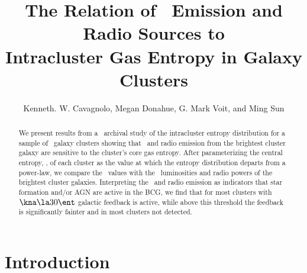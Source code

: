 \documentclass{emulateapj}
\begin{document}
\title{The Relation of \halpha\ Emission and Radio Sources to \\
  Intracluster Gas Entropy in Galaxy Clusters}
\author{
  Kenneth. W. Cavagnolo,
  Megan Donahue,
  G. Mark Voit,
  and Ming Sun}


\begin{abstract}
  We present results from a \Chandra\ archival study of the
  intracluster entropy distribution for a sample of \clnum\ galaxy
  clusters showing that \halpha\ and radio emission from the brightest
  cluster galaxy are sensitive to the cluster's core gas
  entropy. After parameterizing the central entropy, \kna, of each
  cluster as the value at which the entropy distribution departs from
  a power-law, we compare the \kna\ values with the
  \halpha\ luminosities and radio powers of the brightest cluster
  galaxies. Interpreting the \halpha\ and radio emission as indicators
  that star formation and/or AGN are active in the BCG, we find that
  for most clusters with $\kna \la 30 \ent$ galactic feedback is
  active, while above this threshold the feedback is significantly
  fainter and in most clusters not detected.
\end{abstract}


\section{Introduction}
\label{sec:intro}
\end{document}
